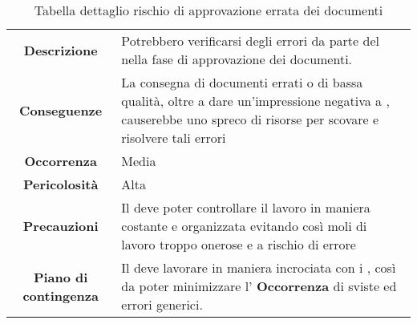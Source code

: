 \renewcommand{\arraystretch}{1}
    \begin{table}[H]
        \begin{center}
            \setlength{\aboverulesep}{0pt}
            \setlength{\belowrulesep}{0pt}
            \setlength{\extrarowheight}{.75ex}
            \begin{tabular}{ c p{10cm} }
                		\toprule 
		\rowcolor{AzzurroGruppo!30}
		\multicolumn{2}{c}{\textbf{Approvazione errata dei documenti}}\\
                \toprule
                \textbf{Descrizione} & Potrebbero verificarsi degli errori da parte del \RdP{} nella fase di approvazione dei documenti. \\
                \textbf{Conseguenze} & La consegna di documenti errati o di bassa qualità, oltre a dare un'impressione negativa a \proponente{}, causerebbe uno spreco di risorse per scovare e risolvere tali errori \\
                 \textbf{Occorrenza} & Media \\
                \textbf{Pericolosità}  & Alta \\
                \textbf{Precauzioni} & Il \RdP{} deve poter controllare il lavoro in maniera costante e organizzata evitando così moli di lavoro troppo onerose e a rischio di errore \\
                 \textbf{Piano di contingenza} & Il \RdP{} deve lavorare in maniera incrociata con i \vers{}, così da poter minimizzare l' \textbf{Occorrenza} di sviste ed errori generici. \\
                \bottomrule
            \end{tabular}
            \caption{Tabella dettaglio rischio di approvazione errata dei documenti}
        \end{center}
    \end{table}


